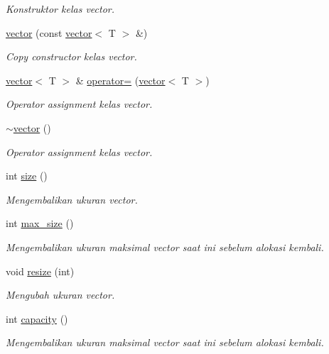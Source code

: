 \begin{DoxyCompactItemize}
\begin{DoxyCompactList}\small\item\em Konstruktor kelas vector. \end{DoxyCompactList}\item 
\hyperlink{classvector_a14efcceb0fa770e5cd88998d23d49767}{vector} (const \hyperlink{classvector}{vector}$<$ T $>$ \&)
\begin{DoxyCompactList}\small\item\em Copy constructor kelas vector. \end{DoxyCompactList}\item 
\hyperlink{classvector}{vector}$<$ T $>$ \& \hyperlink{classvector_ace0bae2999250693936d58b2530c323b}{operator=} (\hyperlink{classvector}{vector}$<$ T $>$)
\begin{DoxyCompactList}\small\item\em Operator assignment kelas vector. \end{DoxyCompactList}\item 
\hyperlink{classvector_a7bc236f547bb5debe890fa8ebaabe965}{$\sim$vector} ()
\begin{DoxyCompactList}\small\item\em Operator assignment kelas vector. \end{DoxyCompactList}\item 
int \hyperlink{classvector_a00d86ff0224b867efa96488fdfe3a163}{size} ()
\begin{DoxyCompactList}\small\item\em Mengembalikan ukuran vector. \end{DoxyCompactList}\item 
int \hyperlink{classvector_a18af0dd0fba070c03f0c92137016ea90}{max\+\_\+size} ()
\begin{DoxyCompactList}\small\item\em Mengembalikan ukuran maksimal vector saat ini sebelum alokasi kembali. \end{DoxyCompactList}\item 
void \hyperlink{classvector_ad216209d5c4f4c9df7e026eb539e1773}{resize} (int)
\begin{DoxyCompactList}\small\item\em Mengubah ukuran vector. \end{DoxyCompactList}\item 
int \hyperlink{classvector_a00c3fb56dd523269e333428be4b78b9c}{capacity} ()
\begin{DoxyCompactList}\small\item\em Mengembalikan ukuran maksimal vector saat ini sebelum alokasi kembali. \end{DoxyCompactList}\item 

\end{DoxyCompactItemize}
